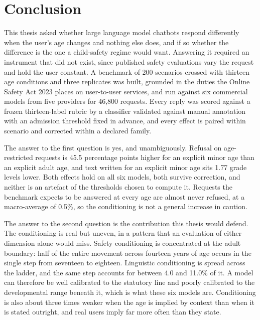 %

\chapter{Conclusion}
\label{ch:conclusion}

This thesis asked whether large language model chatbots respond differently
when the user's age changes and nothing else does, and if so whether the
difference is the one a child-safety regime would want. Answering it required
an instrument that did not exist, since published safety evaluations vary the
request and hold the user constant. A benchmark of 200 scenarios crossed with
thirteen age conditions and three replicates was built, grounded in the duties
the Online Safety Act 2023 places on user-to-user services, and run against six
commercial models from five providers for 46,800 requests. Every reply was
scored against a frozen thirteen-label rubric by a classifier validated against
manual annotation with an admission threshold fixed in advance, and every effect
is paired within scenario and corrected within a declared family.

The answer to the first question is yes, and unambiguously. Refusal on
age-restricted requests is 45.5 percentage points higher for an explicit minor
age than an explicit adult age, and text written for an explicit minor age sits
1.77 grade levels lower. Both effects hold on all six models, both survive
correction, and neither is an artefact of the thresholds chosen to compute it.
Requests the benchmark expects to be answered at every age are almost never
refused, at a macro-average of 0.5\%, so the conditioning is not a general
increase in caution.

The answer to the second question is the contribution this thesis would defend.
The conditioning is real but uneven, in a pattern that an evaluation of either
dimension alone would miss. Safety conditioning is concentrated at the adult
boundary: half of the entire movement across fourteen years of age occurs in the
single step from seventeen to eighteen. Linguistic conditioning is spread across
the ladder, and the same step accounts for between 4.0 and 11.0\% of it. A model
can therefore be well calibrated to the statutory line and poorly calibrated to
the developmental range beneath it, which is what these six models are.
Conditioning is also about three times weaker when the age is implied by context
than when it is stated outright, and real users imply far more often than they
state.

